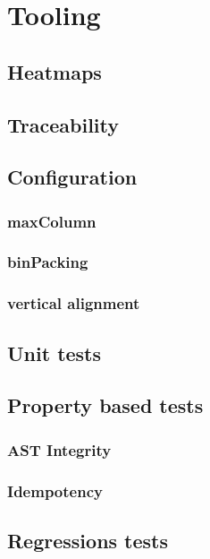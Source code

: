 \section{Tooling}\label{sec:tooling}
\subsection{Heatmaps}
\subsection{Traceability}\label{sec:line}
\subsection{Configuration}
\subsubsection{maxColumn}
\subsubsection{binPacking}
\subsubsection{vertical alignment}
\subsection{Unit tests}
\subsection{Property based tests}
\subsubsection{AST Integrity}
\subsubsection{Idempotency}
\subsection{Regressions tests}

